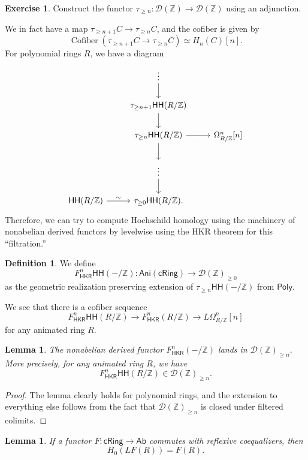 \documentclass[10pt]{amsart}
\newtheorem{lem}[thm]{Lemma}
\theoremstyle{definition}
\newtheorem{defn}[thm]{Definition}
\newtheorem{exer}[thm]{Exercise}
\theoremstyle{remark}
\theoremstyle{plain}
\theoremstyle{definition}
\theoremstyle{remark}
\newcommand{\Z}{\mathbb{Z}}
\newcommand{\mc}[1]{\mathcal{#1}}
\newcommand{\on}[1]{\operatorname{#1}}
\newcommand{\ms}[1]{\mathsf{#1}}
\newcommand{\1}{\mathbf{1}}
\newcommand{\2}{\mathbf{2}}
\newcommand{\3}{\mathbf{3}}
\newcommand{\HH}{\ms{HH}}
\begin{document}
\begin{exer}
    Construct the functor $\tau_{\geq n} \colon \mc{D}(\Z) \to \mc{D}(\Z)$ using an adjunction.
\end{exer}
We in fact have a map $\tau_{\geq n+1} C \to \tau_{\geq n} C$, and the cofiber is given by
\[ \on{Cofiber}(\tau_{\geq n+1} C \to \tau_{\geq n} C) \simeq H_n(C) [n]. \]
For polynomial rings $R$, we have a diagram
\begin{equation*}
\begin{tikzcd}
    & \vdots \ar{d} \\
    & \tau_{\geq n+1} \HH(R/\Z) \ar{d} \\
    & \tau_{\geq n} \HH(R/\Z) \ar{d} \ar{r} & \Omega^n_{R/\Z}[n] \\
    & \vdots \ar{d} & \\
    \HH(R/\Z) \ar{r}{\sim} & \tau_{\geq 0} \HH(R/\Z).
\end{tikzcd}
\end{equation*}
Therefore, we can try to compute Hochschild homology using the machinery of nonabelian derived functors by levelwise using the HKR theorem for this ``filtration.''

\begin{defn}
    We define
    \[ F^n_{\ms{HKR}} \HH(-/\Z) \colon \ms{Ani}(\ms{cRing}) \to \mc{D}(\Z)_{\geq 0} \]
    as the geometric realization preserving extension of $\tau_{\geq n} \HH(-/\Z)$ from $\ms{Poly}$.
\end{defn}

We see that there is a cofiber sequence
\[ F_{\ms{HKR}}^n \HH(R/\Z) \to F^n_{\ms{HKR}}(R/\Z) \to L \Omega^n_{R/\Z}[n] \]
for any animated ring $R$.

\begin{lem}
    The nonabelian derived functor $F^n_{\ms{HKR}}(-/\Z)$ lands in $\mc{D}(\Z)_{\geq n}$. More precisely, for any animated ring $R$, we have
    \[ F^n_{\ms{HKR}} \HH(R/\Z) \in \mc{D}(\Z)_{\geq n}. \]
\end{lem}

\begin{proof}
    The lemma clearly holds for polynomial rings, and the extension to everything else follows from the fact that $\mc{D}(\Z)_{\geq n}$ is closed under filtered colimits.
\end{proof}

\begin{lem}
    If a functor $F \colon \ms{cRing} \to \ms{Ab}$ commutes with reflexive coequalizers, then
    \[ H_0(LF(R)) = F(R). \]
\end{lem}
\end{document}
